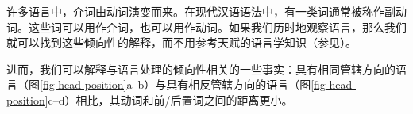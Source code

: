 许多语言中，介词由动词演变而来。在现代汉语语法中，有一类词通常被称作副动词。这些词可以用作介词，也可以用作动词。如果我们历时地观察语言，那么我们就可以找到这些倾向性的解释，而不用参考天赋的语言学知识（参见\citealp[]{EL2009a}）。

进而，我们可以解释与语言处理的倾向性相关的一些事实：具有相同管辖方向的语言（图\ref{fig-head-position}a--b）与具有相反管辖方向的语言（图\ref{fig-head-position}c--d）相比，其动词和前/后置词之间的距离更小。
